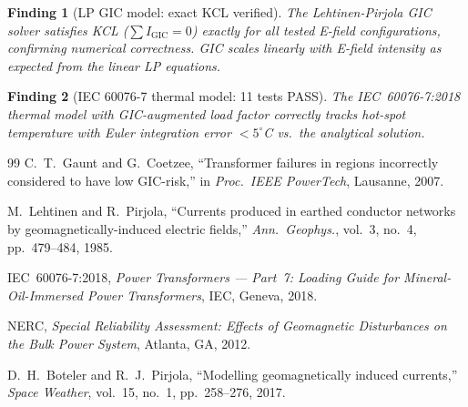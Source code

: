 \documentclass[11pt, a4paper]{article}
\newtheorem{finding}{Finding}
\begin{document}
\begin{finding}[LP GIC model: exact KCL verified]
The Lehtinen-Pirjola GIC solver satisfies KCL ($\sum I_{\mathrm{GIC}} = 0$)
exactly for all tested E-field configurations, confirming numerical correctness.
GIC scales linearly with E-field intensity as expected from the linear LP equations.
\end{finding}

\begin{finding}[IEC 60076-7 thermal model: 11 tests PASS]
The IEC~60076-7:2018 thermal model with GIC-augmented load factor correctly
tracks hot-spot temperature with Euler integration error $< 5^\circ$C
vs.\ the analytical solution.
\end{finding}

\begin{thebibliography}{99}
C.~T.~Gaunt and G.~Coetzee,
``Transformer failures in regions incorrectly considered to have low GIC-risk,''
in \emph{Proc.\ IEEE PowerTech}, Lausanne, 2007.

M.~Lehtinen and R.~Pirjola,
``Currents produced in earthed conductor networks by geomagnetically-induced
electric fields,''
\emph{Ann.\ Geophys.}, vol.~3, no.~4, pp.~479--484, 1985.

IEC~60076-7:2018, \emph{Power Transformers --- Part~7: Loading Guide for
Mineral-Oil-Immersed Power Transformers}, IEC, Geneva, 2018.

NERC, \emph{Special Reliability Assessment: Effects of Geomagnetic
Disturbances on the Bulk Power System}, Atlanta, GA, 2012.

D.~H.~Boteler and R.~J.~Pirjola,
``Modelling geomagnetically induced currents,''
\emph{Space Weather}, vol.~15, no.~1, pp.~258--276, 2017.
\end{thebibliography}
\end{document}
